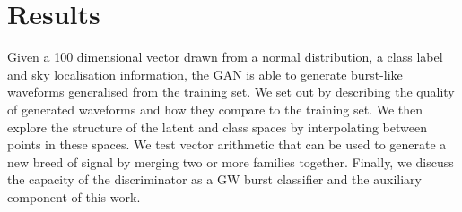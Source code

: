 \documentclass[12pt]{iopart}
\begin{document}

\section{Results}

Given a 100 dimensional vector drawn from a normal distribution, a class label and sky localisation information, the GAN is able to generate burst-like waveforms  generalised from the training set. We set out by describing the quality of generated waveforms and how they compare to the training set. We then explore the structure of the latent and class spaces by interpolating between points in these spaces. We test vector arithmetic that can be used to generate a new breed of signal by merging two or more families together. Finally, we discuss the capacity of the discriminator as a \ac{GW} burst classifier and the auxiliary component of this work. 
\end{document}

